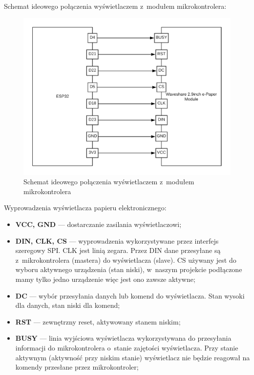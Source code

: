 \documentclass[a4paper,12pt, twoside]{article}
\begin{document}
\begin{enumerate}
            Schemat ideowego połączenia wyświetlaczem z~modułem mikrokontrolera:
            \begin{figure}[H]
    	        \centering
    			\includegraphics[width=12cm]{images/schemat_polaczenia_mikro_z_wyswietlaczem.png}
    			\caption{Schemat ideowego połączenia wyświetlaczem z~modułem mikrokontrolera}
                \label{fig:polecznie_mikro_z_epapierem}
    	    \end{figure}
        
            Wyprowadzenia  wyświetlacza papieru elektronicznego: 
            \begin{itemize}
                \item \textbf{VCC, GND} — dostarczanie zasilania wyświetlaczowi;
                \item \textbf{DIN, CLK, CS} — wyprowadzenia wykorzystywane przez interfejs szeregowy SPI. CLK jest linią zegara. Przez DIN dane przesyłane są z~mikrokontrolera (mastera) do wyświetlacza (slave). CS używany jest do wyboru aktywnego urządzenia (stan niski), w~naszym projekcie podłączone mamy tylko jedno urządzenie więc jest ono zawsze aktywne;
                \item \textbf{DC} — wybór przesyłania danych lub komend do wyświetlacza. Stan wysoki dla danych, stan niski dla komend;
                \item \textbf{RST} — zewnętrzny reset, aktywowany stanem niskim;
                \item \textbf{BUSY}  — linia wyjściowa wyświetlacza wykorzystywana do przesyłania informacji do mikrokontrolera o~stanie zajętości wyświetlacza. Przy stanie aktywnym (aktywność przy niskim stanie) wyświetlacz nie będzie reagował na komendy przesłane przez mikrokontroler; 
            \end{itemize}
        \end{enumerate}
        
\end{document}
